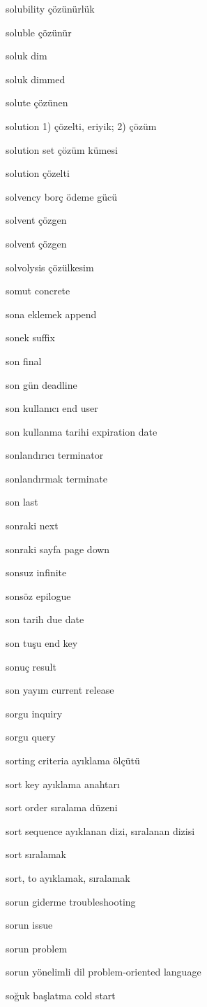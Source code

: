 \documentclass[12pt,fleqn]{article}\usepackage{../../common}
\begin{document}
solubility çözünürlük

soluble çözünür

soluk dim

soluk dimmed

solute çözünen

solution 1) çözelti, eriyik; 2) çözüm

solution set çözüm kümesi

solution çözelti

solvency borç ödeme gücü

solvent çözgen

solvent çözgen

solvolysis çözülkesim

somut concrete

sona eklemek append

sonek suffix

son final

son gün deadline

son kullanıcı end user

son kullanma tarihi expiration date

sonlandırıcı terminator

sonlandırmak terminate

son last

sonraki next

sonraki sayfa page down

sonsuz infinite

sonsöz epilogue

son tarih due date

son tuşu end key

sonuç result

son yayım current release

sorgu inquiry

sorgu query

sorting criteria ayıklama ölçütü

sort key ayıklama anahtarı

sort order sıralama düzeni

sort sequence ayıklanan dizi, sıralanan dizisi

sort sıralamak

sort, to ayıklamak, sıralamak

sorun giderme troubleshooting

sorun issue

sorun problem

sorun yönelimli dil problem-oriented language

soğuk başlatma cold start
\end{document}
